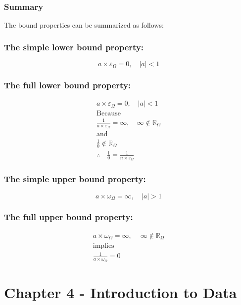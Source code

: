 \documentclass{article}
\begin{document}
\subsubsection{Summary} 
The bound properties can be summarized as follows:
\subsubsection*{The simple lower bound property:}
$$a \times \varepsilon_\Omega = 0, \quad |a| < 1$$
\subsubsection*{The full lower bound property:}
\begin{gather*}
a \times \varepsilon_\Omega = 0, \quad |a| < 1 \\
\text{Because} \\
\frac{1}{a \times \varepsilon_\Omega} = \infty, \quad \infty \notin \mathbb{R}_\Omega \\
\text{and} \\
\frac{1}{0} \notin \mathbb{R}_\Omega \\
\therefore \quad \frac{1}{0} = \frac{1}{n \times \varepsilon_\Omega}
\end{gather*}

\subsubsection*{The simple upper bound property:}
$$a \times \omega_\Omega = \infty, \quad |a| > 1$$

\subsubsection*{The full upper bound property:}
\begin{gather*}
a \times \omega_\Omega=\infty, \quad\ \infty \notin \mathbb{R}_\Omega \\
\text{implies} \\
\frac{1}{a \times \omega_\Omega} = 0
\end{gather*}
\newpage
\section{Chapter 4 - Introduction to Data}
\end{document}
